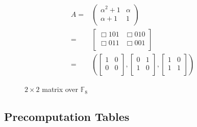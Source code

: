 \documentclass[11pt]{beamer}
\newcommand{\field}[1]{\mathbb{#1}}
\newcommand{\F}{\ensuremath{\field{F}}\xspace}
\begin{document}
\begin{frame}[allowframebreaks]
\begin{figure}[ht]
\begin{eqnarray*}
A =& \left(\begin{array}{cc}
          \alpha^2 + 1 & \alpha \\
          \alpha + 1 & 1 \\
       \end{array}\right)\\
 = & \left[\begin{array}{cc}\Box101&\Box010\\
                                  \Box011&\Box001\\
     \end{array}\right]\\
 = & \left(\left[\begin{array}{cc}
1&0\\
0&0\\
\end{array}\right], \left[\begin{array}{cc}
0&1\\
1&0\\
\end{array}\right], \left[\begin{array}{cccc}
1&0\\
1&1\\
\end{array}\right]\right)
\end{eqnarray*}
\caption{$2 \times 2$ matrix over $\F_{8}$}
\label{fig:example}
\end{figure}


\end{frame}


\subsection{Precomputation Tables}
\end{document}
